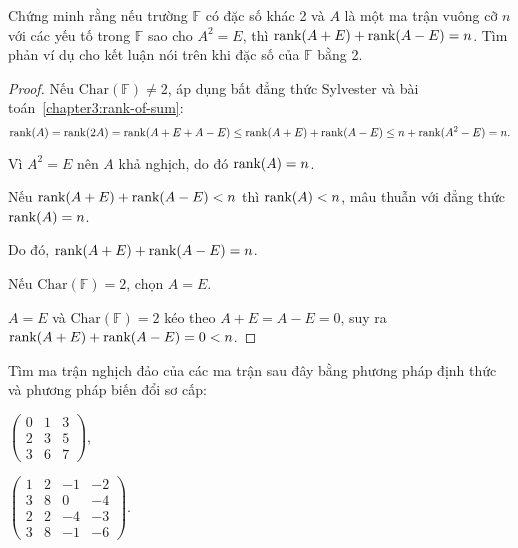 \documentclass[class=nhvh-linear-algebra,crop=false]{standalone}
\begin{document}
\begin{exercise}
	\par Chứng minh rằng nếu trường $\mathbb{F}$ có đặc số khác 2 và $A$ là một ma trận vuông cỡ $n$ với các yếu tố trong $\mathbb{F}$ sao cho $A^{2} = E$, thì $\text{rank}(A + E) + \text{rank}(A - E) = n$. Tìm phản ví dụ cho kết luận nói trên khi đặc số của $\mathbb{F}$ bằng 2.
\end{exercise}

\begin{proof}
	\par Nếu $\text{Char}(\mathbb{F})\ne 2$, áp dụng bất đẳng thức Sylvester và bài toán~\ref{chapter3:rank-of-sum}:
	\[
		\text{rank}(A) = \text{rank}(2A) = \text{rank}(A+E + A-E) \le \text{rank}(A+E) + \text{rank}(A-E) \le n + \text{rank}(A^{2} - E) = n.
	\]
	\par Vì $A^{2} = E$ nên $A$ khả nghịch, do đó $\text{rank}(A) = n$.
	\par Nếu $\text{rank}(A + E) + \text{rank}(A - E) < n$ thì $\text{rank}(A) < n$, mâu thuẫn với đẳng thức $\text{rank}(A) = n$.
	\par Do đó, $\text{rank}(A + E) + \text{rank}(A - E) = n$.
	\bigskip
	\par Nếu $\text{Char}(\mathbb{F}) = 2$, chọn $A = E$.
	\par $A = E$ và $\text{Char}(\mathbb{F}) = 2$ kéo theo $A + E = A - E = 0$, suy ra $\text{rank}(A + E) + \text{rank}(A - E) = 0 < n$.
\end{proof}

\begin{exercise}
	\par Tìm ma trận nghịch đảo của các ma trận sau đây bằng phương pháp định thức và phương pháp biến đổi sơ cấp:
	\begin{center}
		\begin{enumerate*}[label = (\alph*)]
			\item $\begin{pmatrix}
					      0 & 1 & 3 \\
					      2 & 3 & 5 \\
					      3 & 6 & 7
				      \end{pmatrix}$,
			\item $\begin{pmatrix}
					      1 & 2 & -1 & -2 \\
					      3 & 8 & 0  & -4 \\
					      2 & 2 & -4 & -3 \\
					      3 & 8 & -1 & -6
				      \end{pmatrix}$.
		\end{enumerate*}
	\end{center}
\end{exercise}
\end{document}

